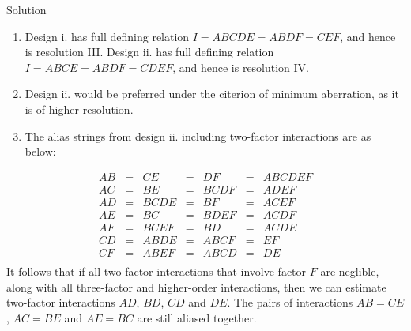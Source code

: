 \documentclass[
]{book}
\theoremstyle{definition}
\theoremstyle{definition}
\theoremstyle{definition}
\theoremstyle{definition}
\theoremstyle{remark}
\begin{document}
Solution

\begin{enumerate}
\def\labelenumi{\alph{enumi}.}
\item
  Design i. has full defining relation \(I = ABCDE = ABDF = CEF\), and hence is resolution III. Design ii. has full defining relation \(I = ABCE = ABDF = CDEF\), and hence is resolution IV.
\item
  Design ii. would be preferred under the citerion of minimum aberration, as it is of higher resolution.
\item
  The alias strings from design ii. including two-factor interactions are as below:
\end{enumerate}

\[
\begin{array}{ccccccc}
AB & = & CE & = & DF & = & ABCDEF \\
AC & = & BE & = & BCDF & = & ADEF \\
AD & = & BCDE & = & BF & = & ACEF \\
AE & = & BC & = & BDEF & = & ACDF \\
AF & = & BCEF & = & BD & = & ACDE \\
CD & = & ABDE & = & ABCF & = & EF \\
CF & = & ABEF & = & ABCD & = & DE \\
\end{array}
\]
It follows that if all two-factor interactions that involve factor \(F\) are neglible, along with all three-factor and higher-order interactions, then we can estimate two-factor interactions \(AD\), \(BD\), \(CD\) and \(DE\). The pairs of interactions \(AB = CE\), \(AC = BE\) and \(AE = BC\) are still aliased together.
\end{document}

